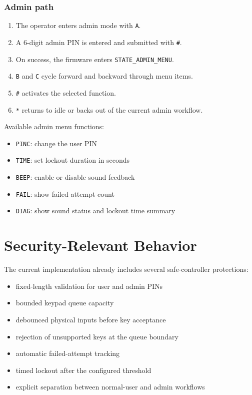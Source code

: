 \documentclass[11pt,a4paper]{article}
\begin{document}
\subsubsection*{Admin path}

\begin{enumerate}[leftmargin=1.7em]
\item The operator enters admin mode with \texttt{A}.
\item A 6-digit admin PIN is entered and submitted with \texttt{\#}.
\item On success, the firmware enters \texttt{STATE\_ADMIN\_MENU}.
\item \texttt{B} and \texttt{C} cycle forward and backward through menu items.
\item \texttt{\#} activates the selected function.
\item \texttt{*} returns to idle or backs out of the current admin workflow.
\end{enumerate}

Available admin menu functions:

\begin{itemize}[leftmargin=1.5em]
\item \texttt{PINC}: change the user PIN
\item \texttt{TIME}: set lockout duration in seconds
\item \texttt{BEEP}: enable or disable sound feedback
\item \texttt{FAIL}: show failed-attempt count
\item \texttt{DIAG}: show sound status and lockout time summary
\end{itemize}

\section{Security-Relevant Behavior}

The current implementation already includes several safe-controller protections:

\begin{itemize}[leftmargin=1.5em]
\item fixed-length validation for user and admin PINs
\item bounded keypad queue capacity
\item debounced physical inputs before key acceptance
\item rejection of unsupported keys at the queue boundary
\item automatic failed-attempt tracking
\item timed lockout after the configured threshold
\item explicit separation between normal-user and admin workflows
\end{itemize}
\end{document}
